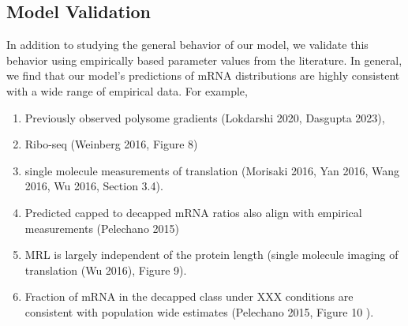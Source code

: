 \documentclass[review]{elsarticle}
\begin{document}
\begin{enumerate}
\begin{enumerate}
\begin{enumerate}
    \end {enumerate}
  \end{enumerate}


\subsection{Model Validation}

In addition to studying the general behavior of our model, we validate this behavior using empirically based parameter values from the literature.
In general, we find that our model's predictions of mRNA distributions are highly consistent with a wide range of empirical data.
For example,
\begin{enumerate}
\item Previously observed polysome gradients (Lokdarshi 2020, Dasgupta 2023), %
\item Ribo-seq (Weinberg 2016, Figure 8)
\item single molecule measurements of translation (Morisaki 2016, Yan 2016, Wang 2016, Wu 2016, Section 3.4).         
\item Predicted capped to decapped mRNA ratios also align with empirical measurements (Pelechano 2015)
\item MRL is largely independent of the protein length (single molecule imaging of translation (Wu 2016), Figure 9).
\item Fraction of mRNA in the decapped class under XXX conditions are consistent with population wide estimates (Pelechano 2015, Figure 10 ). 
\end{enumerate}



\end{enumerate}
\end{document}
